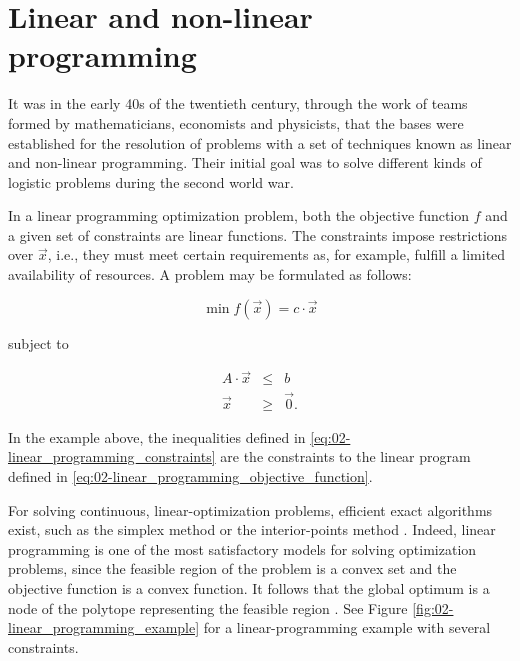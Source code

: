 \section{Linear and non-linear programming}

It was in the early 40s of the twentieth century, through the work
of teams formed by mathematicians, economists and physicists, that
the bases were established for the resolution of problems with a set
of techniques known as linear and non-linear programming. Their initial
goal was to solve different kinds of logistic problems during the
second world war.

In a linear programming optimization problem, both the objective function
$f$ and a given set of constraints are linear functions. The constraints
impose restrictions over $\vec{x}$, i.e., they must meet certain
requirements as, for example, fulfill a limited availability of resources.
A problem may be formulated as follows:

\begin{equation}
\min f(\vec{x})=c\cdot\vec{x}\label{eq:02-linear_programming_objective_function}
\end{equation}


\noindent subject to

\begin{eqnarray}
A\cdot\vec{x} & \le & b\nonumber \\
\vec{x} & \ge & \vec{0}.\label{eq:02-linear_programming_constraints}
\end{eqnarray}


\noindent In the example above, the inequalities defined in \ref{eq:02-linear_programming_constraints}
are the constraints to the linear program defined in \ref{eq:02-linear_programming_objective_function}.

For solving continuous, linear-optimization problems, efficient exact
algorithms exist, such as the simplex method \cite{Dantzig-Maximization_of_a_linear_function_of_variables_subject_to_linear_inequalities:1951}
or the interior-points method \cite{Karmarkar-A_new_polynomial_time_algorithm_for_linear_programming:1984}.
Indeed, linear programming is one of the most satisfactory models
for solving optimization problems, since the feasible region of the
problem is a convex set and the objective function is a convex function.
It follows that the global optimum is a node of the polytope representing
the feasible region \cite{Talbi_Metaheuristics:2009}. See Figure
\ref{fig:02-linear_programming_example} for a linear-programming
example with several constraints.

